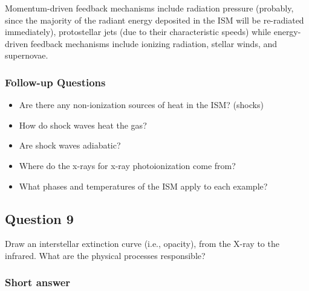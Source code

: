 \documentclass[a4paper,10pt]{article}
\begin{document}
{\noindent}Momentum-driven feedback mechanisms include radiation pressure (probably, since the majority of the radiant energy deposited in the ISM will be re-radiated immediately), protostellar jets (due to their characteristic speeds) while energy-driven feedback mechanisms include ionizing radiation, stellar winds, and supernovae.

\subsubsection{Follow-up Questions}

\begin{itemize}
    \item Are there any non-ionization sources of heat in the ISM? (shocks)
    \item How do shock waves heat the gas?
    \item Are shock waves adiabatic?
    \item Where do the x-rays for x-ray photoionization come from?
    \item What phases and temperatures of the ISM apply to each example?
\end{itemize}


\newpage
\subsection{Question 9}

Draw an interstellar extinction curve (i.e., opacity), from the X-ray to the infrared. What are the physical processes responsible?

\subsubsection{Short answer}
\end{document}
